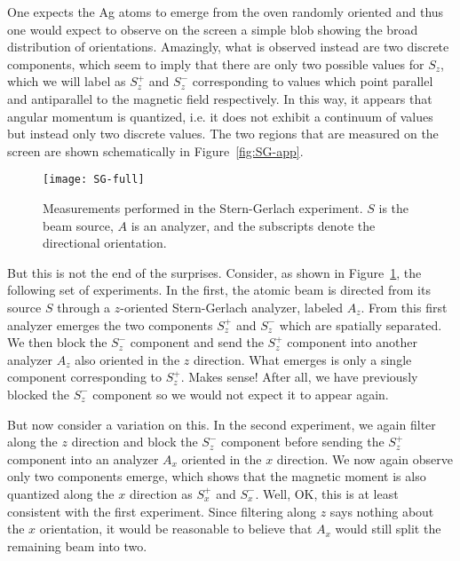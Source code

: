 One expects the Ag atoms to emerge from the oven randomly oriented and thus one would expect to observe on the screen a simple blob showing the broad distribution of orientations. Amazingly, what is observed instead are two discrete components, which seem to imply that there are only two possible values for $S_z$, which we will label as $S_z^+$ and $S_z^-$ corresponding to values which point parallel and antiparallel to the magnetic field respectively. In this way, it appears that angular momentum is quantized, i.e. it does not exhibit a continuum of values but instead only two discrete values. The two regions that are measured on the screen are shown schematically in Figure~\ref{fig:SG-app}. \par

\begin{figure}[!h]
	\centering
	\texttt{[image: SG-full]}
	\caption{Measurements performed in the Stern-Gerlach experiment. $S$ is the beam source, $A$ is an analyzer, and the subscripts denote the directional orientation.}
	\label{fig:SG-full}
\end{figure}

But this is not the end of the surprises. Consider, as shown in Figure~\ref{fig:SG-full}, the following set of experiments. In the first, the atomic beam is directed from its source $S$ through a $z$-oriented Stern-Gerlach analyzer, labeled $A_z$. From this first analyzer emerges the two components $S_z^+$ and $S_z^-$ which are spatially separated. We then block the $S_z^-$ component and send the $S_z^+$ component into another analyzer $A_z$ also oriented in the $z$ direction. What emerges is only a single component corresponding to $S_z^+$. Makes sense! After all, we have previously blocked the $S_z^-$ component so we would not expect it to appear again. \par

But now consider a variation on this. In the second experiment, we again filter along the $z$ direction and block the $S_z^-$ component before sending the $S_z^+$ component into an analyzer $A_x$ oriented in the $x$ direction. We now again observe only two components emerge, which shows that the magnetic moment is also quantized along the $x$ direction as $S_x^+$ and $S_x^-$. Well, OK, this is at least consistent with the first experiment. Since filtering along $z$ says nothing about the $x$ orientation, it would be reasonable to believe that $A_x$ would still split the remaining beam into two. \par

